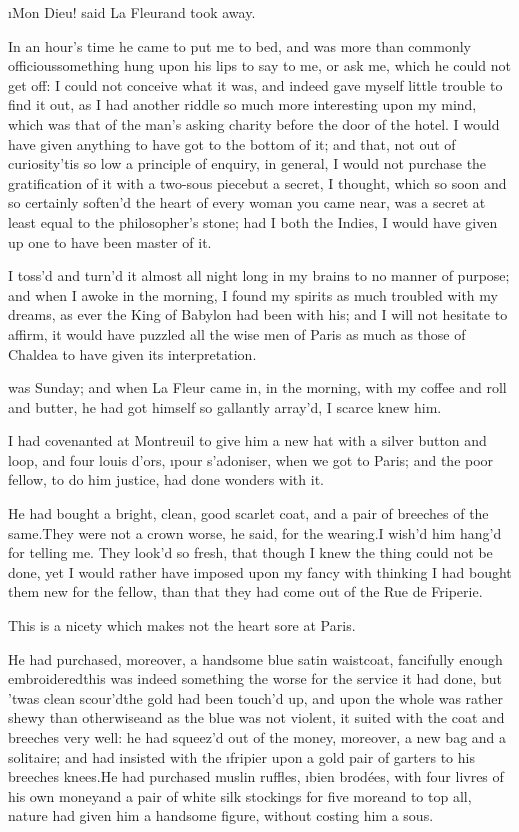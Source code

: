 \documentclass[twoside]{article}
\begin{document}
\i{Mon Dieu}! said La Fleur\tskk and took
away.

In an hour’s time he came to put me to
bed, and was more than commonly
officious\tskk something hung upon his
lips to say to me, or ask me, which he
could not get off: I could not conceive
what it was, and indeed gave myself little
trouble to find it out, as I had another
riddle so much more interesting upon my
mind, which was that of the man’s asking
charity before the door of the hotel.\tskk
I would have given anything to have got to
the bottom of it; and that, not out of
curiosity\tskk ’tis so low a principle of
enquiry, in general, I would not purchase
the gratification of it with a two-sous
piece\tskk but a secret, I thought, which
so soon and so certainly soften’d the
heart of every woman you came near, was a
secret at least equal to the philosopher’s
stone; had I both the Indies, I would have
given up one to have been master of it.

I toss’d and turn’d it almost all night
long in my brains to no manner of purpose;
and when I awoke in the morning, I found
my spirits as much troubled with my
dreams, as ever the King of Babylon had
been with his; and I will not hesitate to
affirm, it would have puzzled all the wise
men of Paris as much as those of Chaldea
to have given its interpretation.





\vskip 6pt


 was Sunday; and when La
Fleur came in, in the morning, with my
coffee and roll and butter, he had got
himself so gallantly array’d, I scarce
knew him.

I had covenanted at Montreuil to give him
a new hat with a silver button and loop,
and four louis d’ors, \i{pour s’adoniser},
when we got to Paris; and the poor fellow,
to do him justice, had done wonders with
it.

He had bought a bright, clean, good
scarlet coat, and a pair of breeches of
the same.\tskk They were not a crown
worse, he said, for the wearing.\tskk I
wish’d him hang’d for telling me.\tskk
They look’d so fresh, that though I knew
the thing could not be done, yet I would
rather have imposed upon my fancy with
thinking I had bought them new for the
fellow, than that they had come out of the
Rue de Friperie.

This is a nicety which makes not the heart
sore at Paris.

He had purchased, moreover, a handsome
blue satin waistcoat, fancifully enough
embroidered\tskk this was indeed
something the worse for the service it had
done, but ’twas clean scour’d\tskk the
gold had been touch’d up, and upon the
whole was rather shewy than
otherwise\tskk and as the blue was not
violent, it suited with the coat and
breeches very well: he had squeez’d out of
the money, moreover, a new bag and a
solitaire; and had insisted with the
\i{fripier} upon a gold pair of garters to
his breeches knees.\tskk He had purchased
muslin ruffles, \i{bien brodées}, with
four livres of his own money\tskk and a
pair of white silk stockings for five
more\tskk and to top all, nature had
given him a handsome figure, without
costing him a sous.
\end{document}

